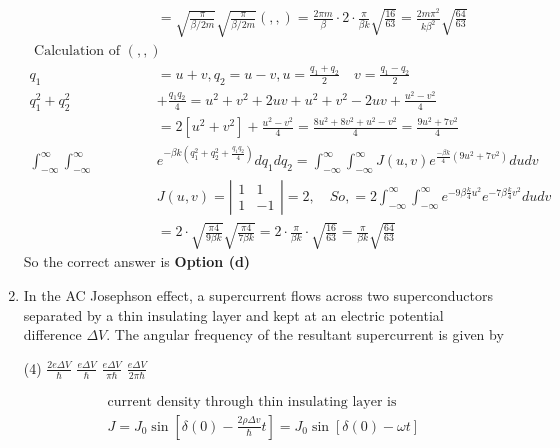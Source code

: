 \begin{enumerate}
\begin{answer}
\begin{align*}
	&=\sqrt{\frac{\pi}{\beta / 2 m}} \sqrt{\frac{\pi}{\beta / 2 m}}(,,)=\frac{2 \pi m}{\beta} \cdot 2 \cdot \frac{\pi}{\beta k} \sqrt{\frac{16}{63}}=\frac{2 m \pi^{2}}{k \beta^{2}} \sqrt{\frac{64}{63}}\\
	\text { Calculation of }(,,)&\\
	q_{1}&=u+v, q_{2}=u-v, u=\frac{q_{1}+q_{2}}{2} \quad v=\frac{q_{1}-q_{2}}{2} \\
	q_{1}^{2}+q_{2}^{2}&+\frac{q_{1} q_{2}}{4}=u^{2}+v^{2}+2 u v+u^{2}+v^{2}-2 u v+\frac{u^{2}-v^{2}}{4} \\
	&=2\left[u^{2}+v^{2}\right]+\frac{u^{2}-v^{2}}{4}=\frac{8 u^{2}+8 v^{2}+u^{2}-v^{2}}{4}=\frac{9 u^{2}+7 v^{2}}{4}\\
	\int_{-\infty}^{\infty} \int_{-\infty}^{\infty} &e^{-\beta k\left(q_{1}^{2}+q_{2}^{2}+\frac{q_{1} q_{2}}{4}\right)} d q_{1} d q_{2}=\int_{-\infty}^{\infty} \int_{-\infty}^{\infty} J(u, v) e^{\frac{-\beta k}{4}\left(9 u^{2}+7 v^{2}\right)} d u d v \\
	&J(u, v)=\left|\begin{array}{cc}
	1 & 1 \\
	1 & -1
	\end{array}\right|=2, \quad S o,=2 \int_{-\infty}^{\infty} \int_{-\infty}^{\infty} e^{-9 \beta \frac{k}{4} u^{2}} e^{-7 \beta \frac{k}{4} v^{2}} d u d v \\
	&=2 \cdot \sqrt{\frac{\pi 4}{9 \beta k}} \sqrt{\frac{\pi 4}{7 \beta k}}=2 \cdot \frac{\pi}{\beta k} \cdot \sqrt{\frac{16}{63}}=\frac{\pi}{\beta k} \sqrt{\frac{64}{63}}
	\end{align*}
	So the correct answer is \textbf{Option (d)}
\end{answer}
\item In the AC Josephson effect, a supercurrent flows across two superconductors separated by a thin insulating layer and kept at an electric potential difference $\Delta V$. The angular frequency of the resultant supercurrent is given by
 \begin{tasks}(4)
	\task[\textbf{a.}] $\frac{2 e \Delta V}{\hbar}$
	\task[\textbf{b.}]$\frac{e \Delta V}{\hbar}$
	\task[\textbf{c.}]$\frac{e \Delta V}{\pi \hbar}$
	\task[\textbf{d.}] $\frac{e \Delta V}{2 \pi \hbar}$
\end{tasks}
\begin{answer}
	\begin{align*}
	\text{
	current density through thin insulating layer is }\\
	J=J_{0} \sin \left[\delta(0)-\frac{2 \rho \Delta v}{\hbar} t\right]=J_{0} \sin [\delta(0)-\omega t]\\

\end{align*}
\end{answer}
\end{enumerate}
